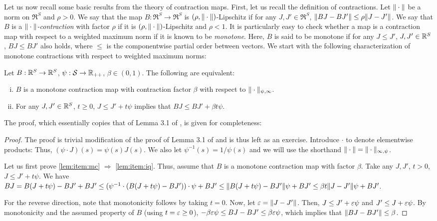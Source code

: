 \documentclass[12pt,draftcls,onecolumn]{IEEEtran}
\begin{document}
Let us now recall some basic results from the theory of contraction maps.
First, let us recall the definition of contractions. Let $\|\cdot\|$ be a norm on $\Re^S$ and $\rho>0$.
We say that the map $B: \Re^S \to \Re^S$ is $(\rho,\|\cdot\|)$-Lipschitz if for any $J,J'\in \Re^S$, $\| BJ - BJ' \| \le \rho \|J-J'\|$. We say that $B$ is a \emph{$\|\cdot\|$-contraction} with factor $\rho$
if it is $(\rho,\|\cdot\|)$-Lipschitz and $\rho<1$. It is particularly easy to check whether a map is a contraction map with respect to a weighted maximum norm
if it is known to be \emph{monotone}.
Here, $B$ is said to be monotone if for any $J\le J'$, $J,J'\in \mathbb{R}^S$, $BJ \le BJ'$ also holds, where $\le$ is the componentwise
partial order between vectors. We start with the following characterization of monotone contractions with respect to weighted maximum norms:
\begin{lemma}
\label{lem:maxnormmn}
Let $B:\mathbb{R}^S \to \mathbb{R}^S$, $\psi: \mathcal{S} \to \mathbb{R}_{++}$, $\beta\in (0,1)$.
The following are equivalent:
\begin{enumerate}[(i)]
\item $B$ is a monotone contraction map with contraction factor $\beta$ with respect to $\|\cdot\|_{\psi,\infty}$.
\label{lem:item:mc}
\item For any $J,J'\in \mathbb{R}^S$, $t\ge 0$, $J \le J' + t \psi$ implies that $BJ \le BJ' + \beta t \psi$.
\label{lem:item:iq}
\end{enumerate}
\end{lemma}
The proof, which essentially copies that of Lemma 3.1 of \cite{Kall17}, is given for completeness:
\begin{proof}
The proof is  trivial modification of the proof of Lemma 3.1 of \cite{Kall17} and is thus left as an exercise.
\fi
Introduce $\cdot$ to denote elementwise products: Thus, $(\psi \cdot J)(s) = \psi(s) J(s)$.
We also let $\psi^{-1}(s) = 1/\psi(s)$ and we will use the shorthand $\|\cdot\| = \|\cdot\|_{\infty,\psi}$.

Let us first prove \eqref{lem:item:mc} $\Rightarrow $ \eqref{lem:item:iq}.
Thus, assume that $B$ is a monotone contraction
map with factor $\beta$. Take any $J,J'$, $t>0$, $J \le J'+ t\psi$.
We have $BJ = B(J + t \psi) - B J' + B J' \le (\psi^{-1} \cdot (B(J + t \psi) - B J' ))\cdot \psi + BJ'
\le \|B(J+t\psi) - BJ'\| \psi + BJ' \le \beta t \|J-J'\| \psi +  BJ'$.

For the reverse direction, note that monotonicity follows by taking $t=0$.
Now, let $\varepsilon = \|J-J'\|$. Then, $J \le J'+ \varepsilon \psi$ and $J' \le J+\varepsilon \psi$.
By monotonicity and the assumed property of $B$ (using $t=\varepsilon\ge 0$),
$-\beta \varepsilon \psi \le BJ - BJ' \le \beta \varepsilon \psi$, which implies
that $\|BJ - BJ'\| \le \beta$.
\end{proof}
\end{document}
